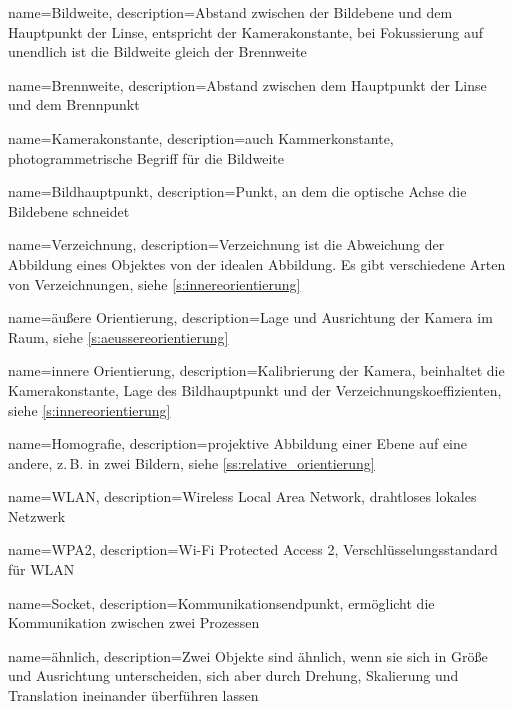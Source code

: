 
{
    name=Bildweite,
    description={Abstand zwischen der Bildebene und dem Hauptpunkt der Linse, entspricht der \Gls{Kamerakonstante}, bei Fokussierung auf unendlich ist die Bildweite gleich der \Gls{Brennweite}}
}

{
    name=Brennweite,
    description={Abstand zwischen dem Hauptpunkt der Linse und dem Brennpunkt}
}

{
    name=Kamerakonstante,
    description={auch Kammerkonstante, photogrammetrische Begriff für die Bildweite}
}

{
    name=Bildhauptpunkt,
    description={Punkt, an dem die optische Achse die Bildebene schneidet}
}

{
    name=Verzeichnung,
    description={Verzeichnung ist die Abweichung der Abbildung eines Objektes von der idealen Abbildung. Es gibt verschiedene Arten von Verzeichnungen, siehe \autoref{s:innereorientierung}
        }
}

{
    name=äußere Orientierung,
    description={Lage und Ausrichtung der Kamera im Raum, siehe \autoref{s:aeussereorientierung}}
}

{
    name=innere Orientierung,
    description={Kalibrierung der Kamera, beinhaltet die \Gls{Kamerakonstante}, Lage des \Gls{Bildhauptpunkt} und der Verzeichnungskoeffizienten, siehe \autoref{s:innereorientierung}}
}

{
    name=Homografie,
    description={projektive Abbildung einer Ebene auf eine andere, z.\,B. in zwei Bildern, siehe \autoref{ss:relative_orientierung}}
}


{
    name=WLAN,
    description={Wireless Local Area Network, drahtloses lokales Netzwerk}
}

{
    name=WPA2,
    description={Wi-Fi Protected Access 2, Verschlüsselungsstandard für \Gls{WLAN}}
}

{
    name=Socket,
    description={Kommunikationsendpunkt, ermöglicht die Kommunikation zwischen zwei Prozessen}
}

{
    name=ähnlich,
    description={Zwei Objekte sind ähnlich, wenn sie sich in Größe und Ausrichtung unterscheiden, sich aber durch Drehung, Skalierung und Translation ineinander überführen lassen}
}


